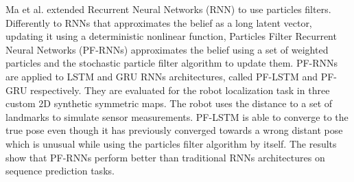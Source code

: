 Ma et al.\cite{DBLP:journals/corr/abs-1905-12885} extended Recurrent Neural Networks (RNN) to use particles filters. Differently to RNNs that approximates the belief as a long latent vector, updating it using a deterministic nonlinear function, Particles Filter Recurrent Neural Networks (PF-RNNs) approximates the belief using a set of weighted particles and the stochastic particle filter algorithm to update them. PF-RNNs are applied to LSTM and GRU RNNs architectures, called PF-LSTM and PF-GRU respectively. They are evaluated for the robot localization task in three custom 2D synthetic symmetric maps. The robot uses the distance to a set of landmarks to simulate sensor measurements. PF-LSTM is able to converge to the true pose even though it has previously converged towards a wrong distant pose which is unusual while using the particles filter algorithm by itself. The results show that PF-RNNs perform better than traditional RNNs architectures on sequence prediction tasks.


